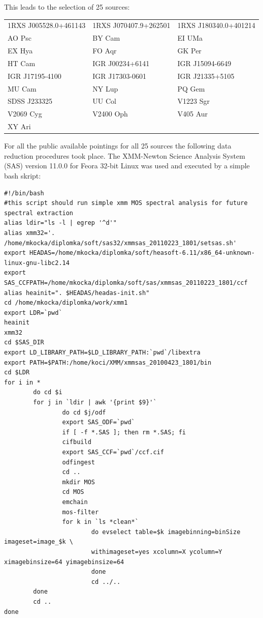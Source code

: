 \documentclass[oneside,a4paper,11pt]{report}
\begin{document}
This leads to the selection of 25 sources:

\begin{footnotesize} 
\begin{tabular}{l l l }\footnotesize
1RXS J005528.0+461143 & 1RXS J070407.9+262501 & 1RXS J180340.0+401214 \\
AO Psc & BY Cam & EI UMa \\
EX Hya & FO Aqr & GK Per\\
HT Cam & IGR J00234+6141 & IGR J15094-6649 \\
IGR J17195-4100 & IGR J17303-0601 & IGR J21335+5105\\
MU Cam & NY Lup& PQ Gem\\
SDSS J233325 & UU Col& V1223 Sgr\\
V2069 Cyg & V2400 Oph &V405 Aur \\
XY Ari & &  \\
\end{tabular}
\end{footnotesize}

For all the public available pointings for all 25 sources the following data reduction procedures 
took place. The XMM-Newton Science Analysis System (SAS) version 11.0.0 for Feora 32-bit Linux 
was used and executed by a simple bash skript: 
\begin{tiny}
\begin{verbatim}
#!/bin/bash
#this script should run simple xmm MOS spectral analysis for future spectral extraction
alias ldir="ls -l | egrep '^d'"
alias xmm32='. /home/mkocka/diplomka/soft/sas32/xmmsas_20110223_1801/setsas.sh'
export HEADAS=/home/mkocka/diplomka/soft/heasoft-6.11/x86_64-unknown-linux-gnu-libc2.14
export SAS_CCFPATH=/home/mkocka/diplomka/soft/sas/xmmsas_20110223_1801/ccf
alias heainit=". $HEADAS/headas-init.sh"
cd /home/mkocka/diplomka/work/xmm1
export LDR=`pwd`
heainit
xmm32
cd $SAS_DIR
export LD_LIBRARY_PATH=$LD_LIBRARY_PATH:`pwd`/libextra
export PATH=$PATH:/home/koci/XMM/xmmsas_20100423_1801/bin
cd $LDR
for i in * 
        do cd $i 
        for j in `ldir | awk '{print $9}'`
                do cd $j/odf
                export SAS_ODF=`pwd`
                if [ -f *.SAS ]; then rm *.SAS; fi
                cifbuild	
                export SAS_CCF=`pwd`/ccf.cif 
                odfingest
                cd ..
                mkdir MOS
                cd MOS
                emchain
                mos-filter 
                for k in `ls *clean*` 
                        do evselect table=$k imagebinning=binSize imageset=image_$k \
                        withimageset=yes xcolumn=X ycolumn=Y ximagebinsize=64 yimagebinsize=64
                        done 
                        cd ../..
        done
        cd ..
done 
\end{verbatim}
\end{tiny}
\end{document}
